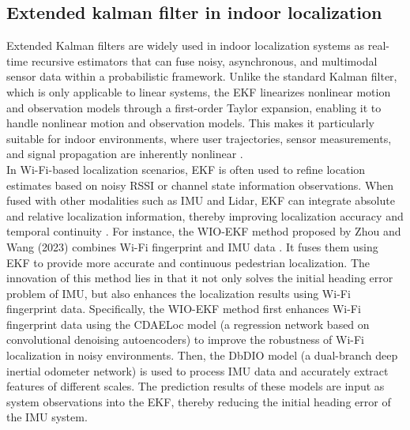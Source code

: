 \documentclass[12pt,a4paper]{article}
\numberwithin{equation}{section}
\begin{document}
\subsection{Extended kalman filter in indoor localization}
Extended Kalman filters are widely used in indoor localization systems as real-time recursive estimators that can fuse noisy, asynchronous, and multimodal sensor data within a probabilistic framework. Unlike the standard Kalman filter, which is only applicable to linear systems, the EKF linearizes nonlinear motion and observation models through a first-order Taylor expansion, enabling it to handle nonlinear motion and observation models. This makes it particularly suitable for indoor environments, where user trajectories, sensor measurements, and signal propagation are inherently nonlinear \cite{barrau2015non}.\\
In Wi-Fi-based localization scenarios, EKF is often used to refine location estimates based on noisy RSSI or channel state information observations. When fused with other modalities such as IMU and Lidar, EKF can integrate absolute and relative localization information, thereby improving localization accuracy and temporal continuity \cite{laoudias2018survey}. For instance, the WIO-EKF method proposed by Zhou and Wang (2023) combines Wi-Fi fingerprint and IMU data \cite{zhou2024wio}. It fuses them using EKF to provide more accurate and continuous pedestrian localization. The innovation of this method lies in that it not only solves the initial heading error problem of IMU, but also enhances the localization results using Wi-Fi fingerprint data. Specifically, the WIO-EKF method first enhances Wi-Fi fingerprint data using the CDAELoc model (a regression network based on convolutional denoising autoencoders) to improve the robustness of Wi-Fi localization in noisy environments. Then, the DbDIO model (a dual-branch deep inertial odometer network) is used to process IMU data and accurately extract features of different scales. The prediction results of these models are input as system observations into the EKF, thereby reducing the initial heading error of the IMU system.
\end{document}
